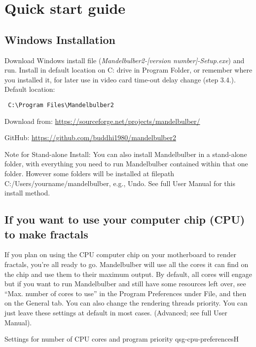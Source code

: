 \section{Quick start guide}\label{quck-start-guide}

\subsection{Windows Installation}\label{qsg-windows-instalation}
Download Windows install file (\emph{Mandelbulber2-[version number]-Setup.exe}) and run. Install in default location on C: drive in Program Folder, or remember where you installed it, for later use in video card time-out delay change (step 3.4.). Default location:
\begin{verbatim} 
 C:\Program Files\Mandelbulber2
\end{verbatim}

Download from:  \href{https://sourceforge.net/projects/mandelbulber/} {https://sourceforge.net/projects/mandelbulber/}

GitHub: \href{https://github.com/buddhi1980/mandelbulber2} { https://github.com/buddhi1980/mandelbulber2}

Note for Stand-alone Install:
You can also install Mandelbulber in a stand-alone folder, with everything you need to run Mandelbulber contained within that one folder. However some folders will be installed at filepath C:/Users/yourname/mandelbulber, e.g., Undo.
See full User Manual for this install method. 

\subsection{If you want to use your computer chip (CPU) to make fractals}\label{qsg-cpu}
If you plan on using the CPU computer chip on your motherboard to render fractals, you’re all ready to go. Mandelbulber will use all the cores it can find on the chip and use them to their maximum output. By default, all cores will engage but if you want to run Mandelbulber and still have some resources left over, see “Max. number of cores to use” in the Program Preferences under File, and then on the General tab.   You can also change the rendering threads priority. You can just leave these settings at default in most cases. (Advanced; see full User Manual).

{Settings for number of CPU cores and program priority}
{qsg-cpu-preferences}{H}


